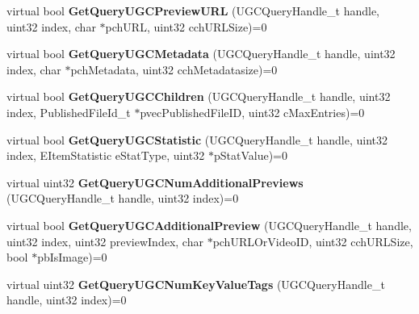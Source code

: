\begin{DoxyCompactItemize}
\item 
\hypertarget{classISteamUGC_a80ca215de03056ec6377cdcb3da2da30}{}virtual bool {\bfseries Get\+Query\+U\+G\+C\+Preview\+U\+R\+L} (U\+G\+C\+Query\+Handle\+\_\+t handle, uint32 index, char $\ast$pch\+U\+R\+L, uint32 cch\+U\+R\+L\+Size)=0\label{classISteamUGC_a80ca215de03056ec6377cdcb3da2da30}

\item 
\hypertarget{classISteamUGC_a0f54a109d4377d535459d4d1433805b2}{}virtual bool {\bfseries Get\+Query\+U\+G\+C\+Metadata} (U\+G\+C\+Query\+Handle\+\_\+t handle, uint32 index, char $\ast$pch\+Metadata, uint32 cch\+Metadatasize)=0\label{classISteamUGC_a0f54a109d4377d535459d4d1433805b2}

\item 
\hypertarget{classISteamUGC_a6ecccbfb655436c3fa0b9936da4400a7}{}virtual bool {\bfseries Get\+Query\+U\+G\+C\+Children} (U\+G\+C\+Query\+Handle\+\_\+t handle, uint32 index, Published\+File\+Id\+\_\+t $\ast$pvec\+Published\+File\+I\+D, uint32 c\+Max\+Entries)=0\label{classISteamUGC_a6ecccbfb655436c3fa0b9936da4400a7}

\item 
\hypertarget{classISteamUGC_a5f22be04a931ce56a4fc4028869dc1fe}{}virtual bool {\bfseries Get\+Query\+U\+G\+C\+Statistic} (U\+G\+C\+Query\+Handle\+\_\+t handle, uint32 index, E\+Item\+Statistic e\+Stat\+Type, uint32 $\ast$p\+Stat\+Value)=0\label{classISteamUGC_a5f22be04a931ce56a4fc4028869dc1fe}

\item 
\hypertarget{classISteamUGC_ae12da428d261f099499b3bb4d2db1178}{}virtual uint32 {\bfseries Get\+Query\+U\+G\+C\+Num\+Additional\+Previews} (U\+G\+C\+Query\+Handle\+\_\+t handle, uint32 index)=0\label{classISteamUGC_ae12da428d261f099499b3bb4d2db1178}

\item 
\hypertarget{classISteamUGC_a8fbe0b4398f0d6360dae9c36940d5c82}{}virtual bool {\bfseries Get\+Query\+U\+G\+C\+Additional\+Preview} (U\+G\+C\+Query\+Handle\+\_\+t handle, uint32 index, uint32 preview\+Index, char $\ast$pch\+U\+R\+L\+Or\+Video\+I\+D, uint32 cch\+U\+R\+L\+Size, bool $\ast$pb\+Is\+Image)=0\label{classISteamUGC_a8fbe0b4398f0d6360dae9c36940d5c82}

\item 
\hypertarget{classISteamUGC_a0c8db5d658fadb17321dd4ee1d225ff4}{}virtual uint32 {\bfseries Get\+Query\+U\+G\+C\+Num\+Key\+Value\+Tags} (U\+G\+C\+Query\+Handle\+\_\+t handle, uint32 index)=0\label{classISteamUGC_a0c8db5d658fadb17321dd4ee1d225ff4}


\end{DoxyCompactItemize}
